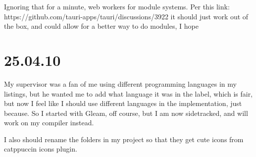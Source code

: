 Ignoring that for a minute, web workers for module systems. Per this link:
https://github.com/tauri-apps/tauri/discussions/3922
it should just work out of the box, and could allow for a better way to do
modules, I hope

\section{25.04.10}

My supervisor was a fan of me using different programming languages in my
listings, but he wanted me to add what language it was in the label, which is
fair, but now I feel like I should use different languages in the
implementation, just because. So I started with Gleam, off course, but I am now
sidetracked, and will work on my compiler instead.

I also should rename the folders in my project so that they get cute icons from
catppuccin icons plugin.
